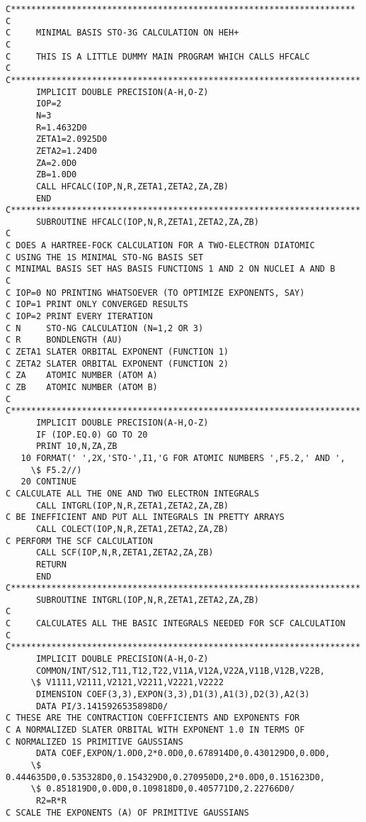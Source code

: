 \begin{verbatim}
C********************************************************************
C
C     MINIMAL BASIS STO-3G CALCULATION ON HEH+
C
C     THIS IS A LITTLE DUMMY MAIN PROGRAM WHICH CALLS HFCALC
C
C*********************************************************************
      IMPLICIT DOUBLE PRECISION(A-H,O-Z)
      IOP=2
      N=3
      R=1.4632D0
      ZETA1=2.0925D0
      ZETA2=1.24D0
      ZA=2.0D0
      ZB=1.0D0
      CALL HFCALC(IOP,N,R,ZETA1,ZETA2,ZA,ZB)
      END
C*********************************************************************
      SUBROUTINE HFCALC(IOP,N,R,ZETA1,ZETA2,ZA,ZB)
C
C DOES A HARTREE-FOCK CALCULATION FOR A TWO-ELECTRON DIATOMIC
C USING THE 1S MINIMAL STO-NG BASIS SET
C MINIMAL BASIS SET HAS BASIS FUNCTIONS 1 AND 2 ON NUCLEI A AND B
C
C IOP=0 NO PRINTING WHATSOEVER (TO OPTIMIZE EXPONENTS, SAY)
C IOP=1 PRINT ONLY CONVERGED RESULTS
C IOP=2 PRINT EVERY ITERATION
C N     STO-NG CALCULATION (N=1,2 OR 3)
C R     BONDLENGTH (AU)
C ZETA1 SLATER ORBITAL EXPONENT (FUNCTION 1)
C ZETA2 SLATER ORBITAL EXPONENT (FUNCTION 2)
C ZA    ATOMIC NUMBER (ATOM A)
C ZB    ATOMIC NUMBER (ATOM B)
C
C*********************************************************************
      IMPLICIT DOUBLE PRECISION(A-H,O-Z)
      IF (IOP.EQ.0) GO TO 20
      PRINT 10,N,ZA,ZB
   10 FORMAT(' ',2X,'STO-',I1,'G FOR ATOMIC NUMBERS ',F5.2,' AND ',
     \$ F5.2//)
   20 CONTINUE
C CALCULATE ALL THE ONE AND TWO ELECTRON INTEGRALS
      CALL INTGRL(IOP,N,R,ZETA1,ZETA2,ZA,ZB)
C BE INEFFICIENT AND PUT ALL INTEGRALS IN PRETTY ARRAYS
      CALL COLECT(IOP,N,R,ZETA1,ZETA2,ZA,ZB)
C PERFORM THE SCF CALCULATION
      CALL SCF(IOP,N,R,ZETA1,ZETA2,ZA,ZB)
      RETURN
      END
C*********************************************************************
      SUBROUTINE INTGRL(IOP,N,R,ZETA1,ZETA2,ZA,ZB)
C
C     CALCULATES ALL THE BASIC INTEGRALS NEEDED FOR SCF CALCULATION
C
C*********************************************************************
      IMPLICIT DOUBLE PRECISION(A-H,O-Z)
      COMMON/INT/S12,T11,T12,T22,V11A,V12A,V22A,V11B,V12B,V22B,
     \$ V1111,V2111,V2121,V2211,V2221,V2222
      DIMENSION COEF(3,3),EXPON(3,3),D1(3),A1(3),D2(3),A2(3)
      DATA PI/3.1415926535898D0/
C THESE ARE THE CONTRACTION COEFFICIENTS AND EXPONENTS FOR
C A NORMALIZED SLATER ORBITAL WITH EXPONENT 1.0 IN TERMS OF
C NORMALIZED 1S PRIMITIVE GAUSSIANS
      DATA COEF,EXPON/1.0D0,2*0.0D0,0.678914D0,0.430129D0,0.0D0,
     \$ 0.444635D0,0.535328D0,0.154329D0,0.270950D0,2*0.0D0,0.151623D0,
     \$ 0.851819D0,0.0D0,0.109818D0,0.405771D0,2.22766D0/
      R2=R*R
C SCALE THE EXPONENTS (A) OF PRIMITIVE GAUSSIANS

\end{verbatim}
